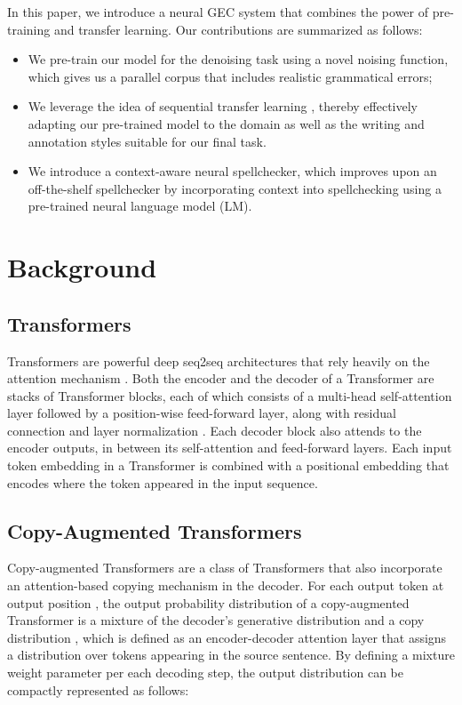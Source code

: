 \documentclass[11pt,a4paper]{article}
\begin{document}
In this paper, we introduce a neural GEC system that combines the power of pre-training and transfer learning.
Our contributions are summarized as follows:
\begin{itemize}
    \item We pre-train our model for the denoising task using a novel noising function, which gives us a parallel corpus that includes realistic grammatical errors;
    \item We leverage the idea of sequential transfer learning \cite{ruder2019neural}, thereby effectively adapting our pre-trained model to the domain as well as the writing and annotation styles suitable for our final task.
    \item We introduce a context-aware neural spellchecker, which improves upon an off-the-shelf spellchecker by incorporating context into spellchecking using a pre-trained neural language model (LM).
\end{itemize}


\section{Background}

\subsection{Transformers}

Transformers \cite{vaswani2017attention} are powerful deep seq2seq architectures that rely heavily on the attention mechanism \cite{bahdanau2015neural, luong2015effective}.
Both the encoder and the decoder of a Transformer are stacks of Transformer blocks, each of which consists of a multi-head self-attention layer followed by a position-wise feed-forward layer, along with residual connection \cite{he2016identity} and layer normalization \cite{ba2016layer}. 
Each decoder block also attends \cite{luong2015effective} to the encoder outputs, in between its self-attention and feed-forward layers.
Each input token embedding in a Transformer is combined with a positional embedding that encodes where the token appeared in the input sequence.


\subsection{Copy-Augmented Transformers}

Copy-augmented Transformers \cite{zhao2019improving} are a class of Transformers that also incorporate an attention-based copying mechanism \cite{gu2016incorporating, see2017get, jia2016data} in the decoder. 
For each output token  at output position , the output probability distribution of a copy-augmented Transformer is a mixture of the decoder's generative distribution  and a copy distribution , which is defined as an encoder-decoder attention layer that assigns a distribution over tokens appearing in the source sentence.  
By defining a mixture weight parameter  per each decoding step, the output distribution can be compactly represented as follows:
\end{document}
